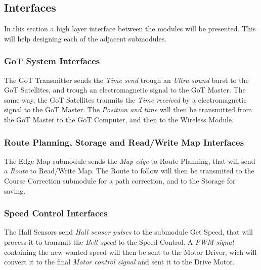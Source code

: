\subsection{Interfaces}
In this section a high layer interface between the modules will be presented. This will help designing each of the adjacent submodules.

\subsubsection{GoT System Interfaces}
The GoT Transmitter sends the \textit{Time send} trough an \textit{Ultra sound} burst to the GoT Satellites, and trough an electromagnetic signal to the GoT Master. The same way, the GoT Satellites tranmits the \textit{Time received} by a electromagnetic signal to the GoT Master. The \textit{Position and time} will then be transmitted from the GoT Master to the GoT Computer, and then to the Wireless Module.

\subsubsection{Route Planning, Storage and Read/Write Map Interfaces}
The Edge Map submodule sends the \textit{Map edge} to Route Planning, that will send a \textit{Route} to Read/Write Map. The Route to follow will then be transmited to the Course Correction submodule for a path correction, and to the Storage for saving.

\subsubsection{Speed Control Interfaces}
The Hall Sensors send \textit{Hall sensor pulses} to the submodule Get Speed, that will process it to transmit the \textit{Belt speed} to the Speed Control. A \textit{PWM signal} containing the new wanted speed will then be sent to the Motor Driver, wich will convert it to the final \textit{Motor control signal} and sent it to the Drive Motor.

